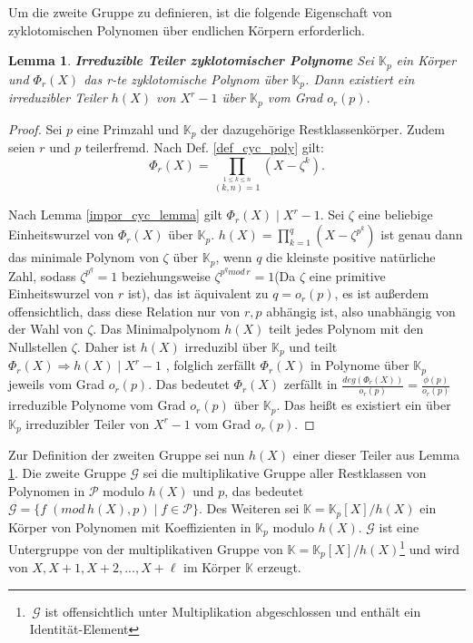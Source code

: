 \documentclass[12pt,oneside]{article}
\newtheorem{lemma}[theorem]{Lemma}
\theoremstyle{remark}
\theoremstyle{definition}
\begin{document}
Um die zweite Gruppe zu definieren, ist die folgende Eigenschaft von zyklotomischen Polynomen über endlichen Körpern erforderlich.

\begin{lemma}\label{cyc_ov_fields}
\textbf{Irreduzible Teiler zyklotomischer Polynome}\newline
Sei $\mathbb{K}_{p}$ ein Körper und $\Phi_{r}(X)$ das r-te zyklotomische Polynom über $\mathbb{K}_{p}$. Dann existiert ein irreduzibler Teiler $h(X)$ von $X^r - 1$ über $\mathbb{K}_{p}$ vom Grad $o_{r}(p).$
\end{lemma}

\begin{proof}
    Sei $p$ eine Primzahl und $\mathbb{K}_{p}$ der dazugehörige Restklassenkörper. Zudem seien $r$ und $p$ teilerfremd. Nach Def. \ref{def_cyc_poly} gilt: 
    \begin{equation}\label{rth_cy}
        \Phi _{r}(X)=\prod _{\stackrel {1\leq k\leq n}{(k,n)=1}}\left(X- \zeta^k\right).
    \end{equation}
    
Nach Lemma \ref{impor_cyc_lemma} gilt $\Phi_{r}(X) \mid  X^{r} - 1$. Sei $\zeta$ eine beliebige Einheitswurzel von $\Phi_r(X)$  über $\mathbb{K}_p$. $h(X) = \prod_{k = 1}^{q} (X - \zeta^{p^k})$ ist genau dann das minimale Polynom von $\zeta$ über $\mathbb{K}_p$, wenn $q$ die kleinste positive natürliche Zahl, sodass $\zeta^{p^q} = 1$ beziehungsweise $\zeta^{p^q mod \, r} = 1$(Da $\zeta$ eine primitive Einheitswurzel von $r$ ist), das ist äquivalent zu $q = o_r(p)$, es ist außerdem offensichtlich, dass diese Relation nur von $r,p$ abhängig ist, also unabhängig von der Wahl von $\zeta$. Das Minimalpolynom $h(X)$ teilt jedes Polynom mit den Nullstellen $\zeta$. Daher ist $h(X)$ irreduzibl über $\mathbb{K}_p$ und teilt $\Phi_{r}(X) \Rightarrow h(X) \mid X^r - 1$ , folglich zerfällt $\Phi_r(X)$ in Polynome über $\mathbb{K}_p$ jeweils vom Grad $o_r(p)$. Das bedeutet $\Phi_{r}(X)$ zerfällt in $\frac{deg(\Phi_{r}(X))}{o_r(p)} = \frac{\phi(p)}{o_r(p)}$ irreduzible Polynome vom Grad $o_r(p)$ über $\mathbb{K}_p$. Das heißt es existiert ein über $\mathbb{K}_p$ irreduzibler Teiler von $X^r - 1$ vom Grad $o_r(p)$.              
\end{proof}

Zur Definition der zweiten Gruppe sei nun $h(X)$ einer dieser Teiler aus Lemma \ref{cyc_ov_fields}. Die zweite Gruppe $\mathcal{G}$ sei die multiplikative Gruppe aller Restklassen von Polynomen in $\mathcal{P}$ modulo $h(X)$ und $p$, das bedeutet $\mathcal{G} = \{f \; (mod \, h(X), p) \mid f \in \mathcal{P} \}$. Des Weiteren sei $\mathbb{K} = \mathbb{K}_p[X] /h(X)$ ein Körper von Polynomen mit Koeffizienten in $\mathbb{K}_{p}$ modulo $h(X)$. $\mathcal{G}$ ist eine Untergruppe von der multiplikativen Gruppe von  $\mathbb{K} = \mathbb{K}_p[X] / h(X)$\footnote{$ \, \mathcal{G}$ ist offensichtlich unter Multiplikation abgeschlossen und enthält ein Identität-Element} und wird von $X,X+1,X+2, ..., X + \ell $ im Körper $\mathbb{K}$ erzeugt.\newline
\end{document}
